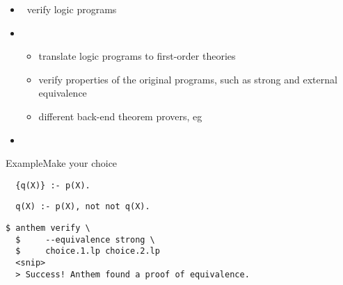 \begin{frame}{\anthem}
  \begin{itemize}
  \item {} \ verify logic programs
  \item {}
    \begin{itemize}
      \item translate logic programs to first-order theories
      \item verify properties of the original programs, such as strong and external equivalence
      \item different back-end theorem provers, eg \vampire
    \end{itemize}
  \item {} \ \cite{lilusc19a,falilusc20a}
  \end{itemize}
\end{frame}
\begin{frame}[fragile]{Example}{Make your choice}
  \centering
  \begin{lstlisting}[basicstyle=\small\ttfamily]
  % choice.1.lp
  {q(X)} :- p(X).
  \end{lstlisting}
  \vfill
  \begin{lstlisting}[basicstyle=\small\ttfamily]
  % choice.2.lp
  q(X) :- p(X), not not q(X).
  \end{lstlisting}
  \vfill
  \begin{lstlisting}[basicstyle=\small\ttfamily]
  $ anthem verify \
  $     --equivalence strong \
  $     choice.1.lp choice.2.lp
  <snip>
  > Success! Anthem found a proof of equivalence.
  \end{lstlisting}
\end{frame}
%
